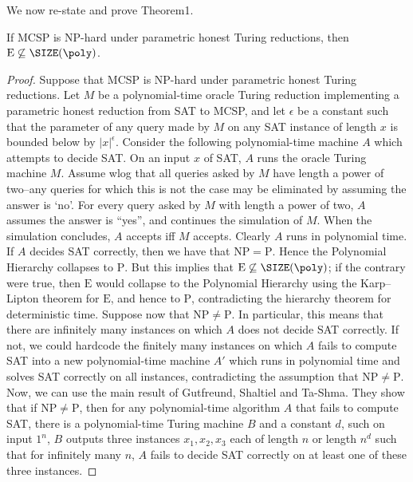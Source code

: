 We now re-state and prove Theorem1.
\begin{nttheorem}
If MCSP is NP-hard under parametric honest Turing reductions, then $\mathrm E\not\subseteq\SIZE(\poly)$.
\end{nttheorem}
\begin{proof}
Suppose that MCSP is NP-hard under parametric honest Turing reductions. Let $M$ be a polynomial-time oracle Turing reduction implementing a parametric honest reduction from SAT to MCSP, and let $\epsilon$ be a constant such that the parameter of any query made by $M$ on any SAT instance of length $x$ is bounded below by $|x|^\epsilon$.
Consider the following polynomial-time machine $A$ which attempts to decide SAT. On an input $x$ of SAT, $A$ runs the oracle Turing machine $M$. Assume wlog that all queries asked by $M$ have length a power of two--any queries for which this is not the case may be eliminated by assuming the answer is `no'. For every query asked by $M$ with length a power of two, $A$ assumes the answer is ``yes'', and continues the simulation of $M$. When the simulation concludes, $A$ accepts iff $M$ accepts.
Clearly $A$ runs in polynomial time. If $A$ decides SAT correctly, then we have that $\mathrm{NP}=\mathrm P$. Hence the Polynomial Hierarchy collapses to $\mathrm P$. But this implies that $\mathrm E\not\subseteq\SIZE(\poly)$; if the contrary were true, then $\mathrm E$ would collapse to the Polynomial Hierarchy using the Karp--Lipton theorem for $\mathrm E$, and hence to $\mathrm P$, contradicting the hierarchy theorem for deterministic time.
Suppose now that $\mathrm{NP}\ne\mathrm P$. In particular, this means that there are infinitely many instances on which $A$ does not decide SAT correctly. If not, we could hardcode the finitely many instances on which $A$ fails to compute SAT into a new polynomial-time machine $A'$ which runs in polynomial time and solves SAT correctly on all instances, contradicting the assumption that $\mathrm{NP}\ne\mathrm P$.
Now, we can use the main result of Gutfreund, Shaltiel and Ta-Shma. They show that if $\mathrm{NP}\ne\mathrm P$, then for any polynomial-time algorithm $A$ that fails to compute SAT, there is a polynomial-time Turing machine $B$ and a constant $d$, such on input $1^n$, $B$ outputs three instances $x_1,x_2,x_3$ each of length $n$ or length $n^d$ such that for infinitely many $n$, $A$ fails to decide SAT correctly on at least one of these three instances.

\end{proof}

